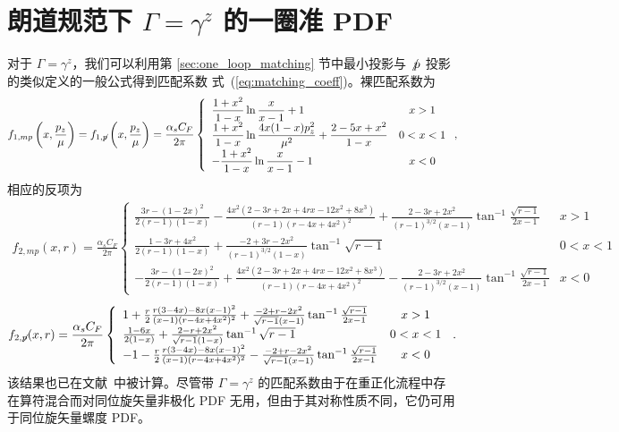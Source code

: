 \section{朗道规范下 $\Gamma=\gamma^z$ 的一圈准 PDF}\label{app:one-loop_gamma_z}
对于 $\Gamma=\gamma^z$，我们可以利用第 \ref{sec:one_loop_matching} 节中最小投影与 $\slashed p$ 投影的类似定义的一般公式得到匹配系数 式~(\ref{eq:matching_coeff})。裸匹配系数为
\begin{align}
f_{1,mp}\left(x,\frac{p_z}{\mu}\right)=f_{1,\slashed p}\left(x,\frac{p_z}{\mu}\right)=\frac{\alpha_s C_F}{2\pi}\left\{
\begin{array}{lc}
\displaystyle \frac{1+x^2}{1-x}\ln\frac{x}{x-1}+1 & x>1\\
\displaystyle \frac{1+x^2}{1-x}\ln\frac{4x(1-x)p_z^2}{\mu^2}+\frac{2-5x+x^2}{1-x} & 0<x<1\\
\displaystyle -\frac{1+x^2}{1-x}\ln\frac{x}{x-1}-1 & x<0
\end{array} \right. ,
\end{align}
相应的反项为
\begin{align}
f_{2,mp}(x,r)=\frac{\alpha_s C_F}{2\pi}\left\{
\begin{array}{lc}
\frac{3r-(1-2x)^2}{2(r-1)(1-x)}-\frac{4x^2(2-3r+2x+4rx-12x^2+8x^3)}{(r-1)(r-4x+4x^2)^2}+\frac{2-3r+2x^2}{(r-1)^{3/2}(x-1)}\tan^{-1}\frac{\sqrt{r-1}}{2x-1} & x>1\\
\frac{1-3r+4x^2}{2(r-1)(1-x)}+\frac{-2+3r-2x^2}{(r-1)^{3/2}(1-x)}\tan^{-1}\sqrt{r-1} & 0<x<1\\
-\frac{3r-(1-2x)^2}{2(r-1)(1-x)}+\frac{4x^2(2-3r+2x+4rx-12x^2+8x^3)}{(r-1)(r-4x+4x^2)^2}-\frac{2-3r+2x^2}{(r-1)^{3/2}(x-1)}\tan^{-1}\frac{\sqrt{r-1}}{2x-1} & x<0
\end{array} \right.
\end{align}
\begin{align}
f_{2,\slashed{p}}(x,r)=\frac{\alpha_s C_F}{2\pi}\left\{
\begin{array}{lc}
1+\frac{r}{2}\frac{r(3-4x)-8x(x-1)^2}{(x-1)(r-4x+4x^2)^2}+\frac{-2+r-2x^2}{\sqrt{r-1}(x-1)}\tan^{-1}\frac{\sqrt{r-1}}{2x-1} & x>1\\
\frac{1-6x}{2(1-x)}+\frac{2-r+2x^2}{\sqrt{r-1}(1-x)}\tan^{-1}\sqrt{r-1} & 0<x<1\\
-1-\frac{r}{2}\frac{r(3-4x)-8x(x-1)^2}{(x-1)(r-4x+4x^2)^2}-\frac{-2+r-2x^2}{\sqrt{r-1}(x-1)}\tan^{-1}\frac{\sqrt{r-1}}{2x-1} & x<0
\end{array} \right.\,.
\end{align}
该结果也已在文献~\cite{Stewart:2017tvs}中被计算。尽管带 $\Gamma=\gamma^z$ 的匹配系数由于在重正化流程中存在算符混合而对同位旋矢量非极化 PDF 无用，但由于其对称性质不同，它仍可用于同位旋矢量螺度 PDF。



